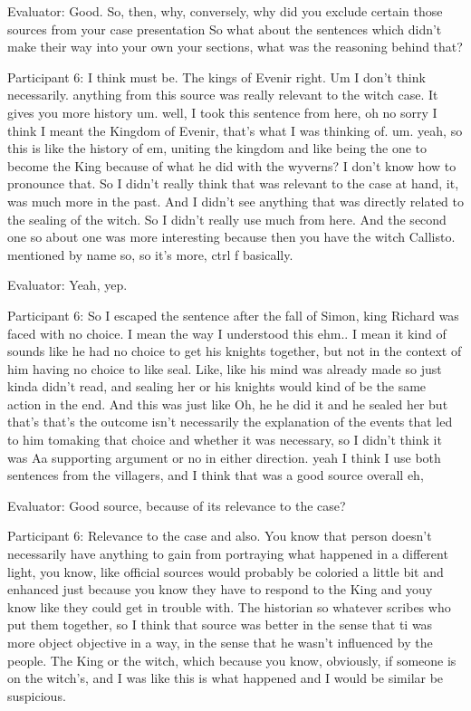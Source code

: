 \documentclass{l4proj}
\begin{document}
\begin{appendices}
Evaluator: Good. So, then, why, conversely, why did you exclude certain those sources from your case presentation So what about the sentences which didn't make their way into your own your sections, what was the reasoning behind that?

Participant 6: I think must be. The kings of Evenir right. Um I don't think necessarily. anything from this source was really relevant to the witch case. It gives you more history um. well, I took this sentence from here, oh no sorry I think I meant the Kingdom of Evenir, that’s what I was thinking of. um. yeah, so this is like the history of em, uniting the kingdom and like being the one to become the King because of what he did with the wyverns? I don’t know how to pronounce that.  So I didn't really think that was relevant to the case at hand, it,  was much more in the past. And I didn't see anything that was directly related to the sealing of the witch. So I didn’t really use much from here. And the second one so about one was more interesting because then you have the witch Callisto. mentioned by name so, so it’s more, ctrl f basically. 

Evaluator: Yeah, yep. 

Participant 6: So I escaped the sentence after the fall of Simon, king Richard was faced with no choice. I mean the way I understood this ehm.. I mean it kind of sounds like he had no choice to get his knights together, but not in the context of him having no choice to like seal. Like, like his mind was already made so just kinda didn’t read, and sealing her or his knights would kind of be the same action in the end. And this was just like Oh, he he did it and he sealed her but that's that's the outcome isn't necessarily the explanation of the events that led to him tomaking that choice and whether it was necessary, so I didn’t think it was Aa supporting argument or no in either direction. yeah I think I use both sentences from the villagers, and I think that was a good source overall eh,

Evaluator: Good source, because of its relevance to the case?

Participant 6: Relevance to the case and also. You know that person doesn't necessarily have anything to gain from portraying what happened in a different light, you know, like official sources would probably be coloried a little bit  and enhanced just because you know they have to respond to the King and youy know like they could get in trouble with. The historian so whatever scribes who put them together, so I think that source was better in the sense that ti was more object objective in a way, in the sense that he wasn't influenced by the people. The King or the witch, which because you know, obviously, if someone is on the witch’s, and I was like this is what happened and I would be similar be suspicious.


\end{appendices}
\end{document}
